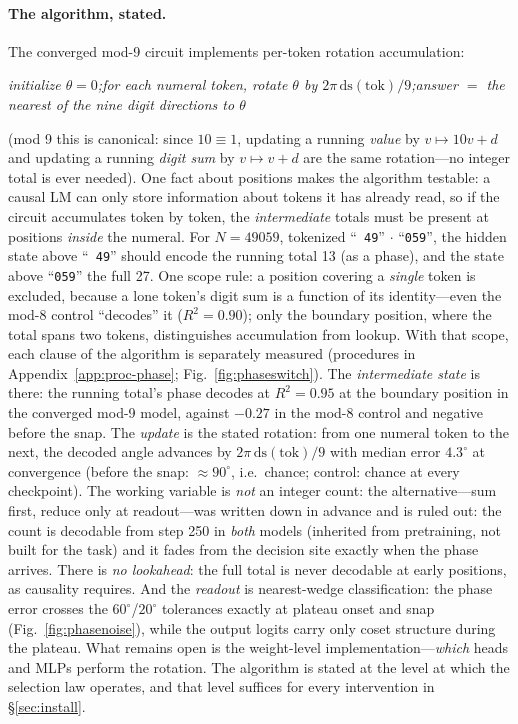 \documentclass{article} %
\begin{document}
\paragraph{The algorithm, stated.} The converged mod-9 circuit implements per-token rotation accumulation:
\begin{center}
\emph{initialize $\theta = 0$;\quad for each numeral token, rotate $\theta$ by $2\pi\,\mathrm{ds}(\mathrm{tok})/9$;\quad answer $=$ the nearest of the nine digit directions to $\theta$}
\end{center}
(mod 9 this is canonical: since $10 \equiv 1$, updating a running \emph{value} by $v \mapsto 10v{+}d$ and updating a running \emph{digit sum} by $v \mapsto v{+}d$ are the same rotation---no integer total is ever needed). One fact about positions makes the algorithm testable: a causal LM can only store information about tokens it has already read, so if the circuit accumulates token by token, the \emph{intermediate} totals must be present at positions \emph{inside} the numeral. For $N = 49059$, tokenized ``\texttt{ 49}''$\,\cdot\,$``\texttt{059}'', the hidden state above ``\texttt{ 49}'' should encode the running total 13 (as a phase), and the state above ``\texttt{059}'' the full 27. One scope rule: a position covering a \emph{single} token is excluded, because a lone token's digit sum is a function of its identity---even the mod-8 control ``decodes'' it ($R^2 = 0.90$); only the boundary position, where the total spans two tokens, distinguishes accumulation from lookup. With that scope, each clause of the algorithm is separately measured (procedures in Appendix~\ref{app:proc-phase}; Fig.~\ref{fig:phaseswitch}). The \emph{intermediate state} is there: the running total's phase decodes at $R^2 = 0.95$ at the boundary position in the converged mod-9 model, against $-0.27$ in the mod-8 control and negative before the snap. The \emph{update} is the stated rotation: from one numeral token to the next, the decoded angle advances by $2\pi\,\mathrm{ds}(\mathrm{tok})/9$ with median error $4.3^\circ$ at convergence (before the snap: $\approx 90^\circ$, i.e.\ chance; control: chance at every checkpoint). The working variable is \emph{not} an integer count: the alternative---sum first, reduce only at readout---was written down in advance and is ruled out: the count is decodable from step 250 in \emph{both} models (inherited from pretraining, not built for the task) and it fades from the decision site exactly when the phase arrives. There is \emph{no lookahead}: the full total is never decodable at early positions, as causality requires. And the \emph{readout} is nearest-wedge classification: the phase error crosses the $60^\circ$/$20^\circ$ tolerances exactly at plateau onset and snap (Fig.~\ref{fig:phasenoise}), while the output logits carry only coset structure during the plateau. What remains open is the weight-level implementation---\emph{which} heads and MLPs perform the rotation. The algorithm is stated at the level at which the selection law operates, and that level suffices for every intervention in \S\ref{sec:install}.
\end{document}
